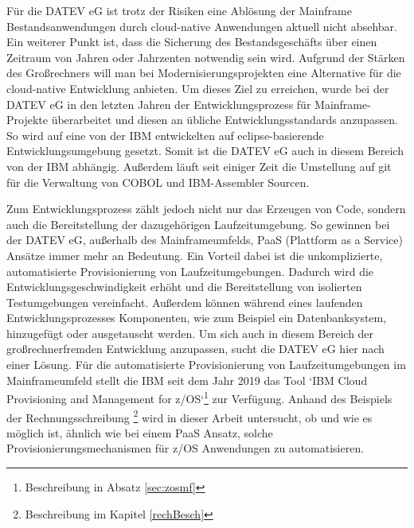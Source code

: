 Für die DATEV eG ist trotz der Risiken eine Ablösung der Mainframe Bestandsanwendungen durch cloud-native Anwendungen aktuell nicht absehbar.
Ein weiterer Punkt ist, dass die Sicherung des Bestandsgeschäfts über einen Zeitraum von Jahren oder Jahrzenten notwendig sein wird.
Aufgrund der Stärken des Großrechners will man bei Modernisierungsprojekten eine Alternative für die cloud-native Entwicklung anbieten.
Um dieses Ziel zu erreichen, wurde bei der DATEV eG in den letzten Jahren der Entwicklungsprozess für Mainframe-Projekte überarbeitet und diesen an übliche Entwicklungsstandards anzupassen.
So wird auf eine von der IBM entwickelten auf eclipse-basierende Entwicklungsumgebung gesetzt.
Somit ist die DATEV eG auch in diesem Bereich von der IBM abhängig.
Außerdem läuft seit einiger Zeit die Umstellung auf git für die Verwaltung von COBOL und IBM-Assembler Sourcen.

Zum Entwicklungsprozess zählt jedoch nicht nur das Erzeugen von Code, sondern auch die Bereitstellung der dazugehörigen Laufzeitumgebung.
So gewinnen bei der DATEV eG, außerhalb des Mainframeumfelds, PaaS (Plattform as a Service) Ansätze immer mehr an Bedeutung.
Ein Vorteil dabei ist die unkomplizierte, automatisierte Provisionierung von Laufzeitumgebungen.
Dadurch wird die Entwicklungsgeschwindigkeit erhöht und die Bereitstellung von isolierten Testumgebungen vereinfacht.
Außerdem können während eines laufenden Entwicklungsprozesses Komponenten, wie zum Beispiel ein Datenbanksystem, hinzugefügt oder ausgetauscht werden.
Um sich auch in diesem Bereich der großrechnerfremden Entwicklung anzupassen, sucht die DATEV eG hier nach einer Lösung.
Für die automatisierte Provisionierung von Laufzeitumgebungen im Mainframeumfeld stellt die IBM seit dem Jahr 2019 das Tool `IBM Cloud Provisioning and Management for z/OS`\footnote{Beschreibung in Absatz \ref{sec:zosmf}} zur Verfügung.
Anhand des Beispiels der Rechnungsschreibung \footnote{Beschreibung im Kapitel \ref{rechBesch}} wird in dieser Arbeit untersucht, ob und wie es möglich ist, ähnlich wie bei einem PaaS Ansatz, solche Provisionierungsmechanismen für z/OS Anwendungen zu automatisieren.
